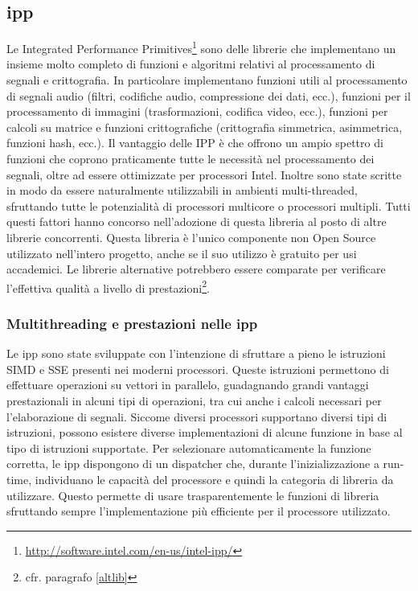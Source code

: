 \subsection{\ac{ipp}}
Le Integrated Performance
Primitives\footnote{\url{http://software.intel.com/en-us/intel-ipp/}} sono delle
librerie che implementano un insieme molto completo di funzioni e algoritmi
relativi al processamento di segnali e crittografia. In particolare implementano
funzioni utili al processamento di segnali audio (filtri, codifiche audio,
compressione dei dati, ecc.), funzioni per il processamento di immagini
(trasformazioni, codifica video, ecc.), funzioni per calcoli su matrice e
funzioni crittografiche (crittografia simmetrica, asimmetrica, funzioni hash,
ecc.).  Il vantaggio delle IPP \`e che offrono un ampio spettro di funzioni che
coprono praticamente tutte le necessit\`a nel processamento dei segnali, oltre
ad essere ottimizzate per processori Intel. Inoltre sono state scritte in modo
da essere naturalmente utilizzabili in ambienti multi-threaded, sfruttando tutte
le potenzialit\`a di processori multicore o processori multipli. Tutti questi
fattori hanno concorso nell'adozione di questa libreria al posto di altre
librerie concorrenti. Questa libreria \`e l'unico componente non Open Source
utilizzato nell'intero progetto, anche se il suo utilizzo \`e gratuito per usi
accademici. Le librerie alternative potrebbero essere comparate per verificare
l'effettiva qualit\`a a livello di prestazioni\footnote{cfr. paragrafo
\ref{altlib}}.

\subsubsection{Multithreading e prestazioni nelle \ac{ipp}}
Le \ac{ipp} sono state sviluppate con l'intenzione di sfruttare a pieno le
istruzioni \ac{SIMD} e \ac{SSE} presenti nei moderni processori. Queste
istruzioni permettono di effettuare operazioni su vettori in parallelo,
guadagnando grandi vantaggi prestazionali in alcuni tipi di operazioni, tra cui
anche i calcoli necessari per l'elaborazione di segnali. Siccome diversi
processori supportano diversi tipi di istruzioni, possono esistere diverse
implementazioni di alcune funzione in base al tipo di istruzioni supportate. Per
selezionare automaticamente la funzione corretta, le \ac{ipp} dispongono di un
dispatcher che, durante l'inizializzazione a run-time, individuano le capacit\`a
del processore e quindi la categoria di libreria da utilizzare. Questo permette
di usare trasparentemente le funzioni di libreria sfruttando sempre
l'implementazione pi\`u efficiente per il processore utilizzato.

